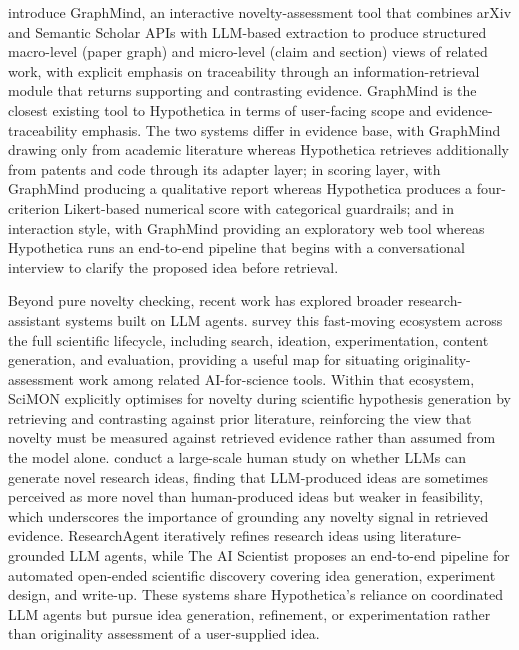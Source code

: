 \citet{dasilva2025graphmind} introduce GraphMind, an interactive novelty-assessment tool that combines arXiv and Semantic Scholar APIs with LLM-based extraction to produce structured macro-level (paper graph) and micro-level (claim and section) views of related work, with explicit emphasis on traceability through an information-retrieval module that returns supporting and contrasting evidence. GraphMind is the closest existing tool to Hypothetica in terms of user-facing scope and evidence-traceability emphasis. The two systems differ in evidence base, with GraphMind drawing only from academic literature whereas Hypothetica retrieves additionally from patents and code through its adapter layer; in scoring layer, with GraphMind producing a qualitative report whereas Hypothetica produces a four-criterion Likert-based numerical score with categorical guardrails; and in interaction style, with GraphMind providing an exploratory web tool whereas Hypothetica runs an end-to-end pipeline that begins with a conversational interview to clarify the proposed idea before retrieval.

Beyond pure novelty checking, recent work has explored broader research-assistant systems built on LLM agents. \citet{eger2025} survey this fast-moving ecosystem across the full scientific lifecycle, including search, ideation, experimentation, content generation, and evaluation, providing a useful map for situating originality-assessment work among related AI-for-science tools. Within that ecosystem, SciMON \citep{wang2024scimon} explicitly optimises for novelty during scientific hypothesis generation by retrieving and contrasting against prior literature, reinforcing the view that novelty must be measured against retrieved evidence rather than assumed from the model alone. \citet{si2024llmideas} conduct a large-scale human study on whether LLMs can generate novel research ideas, finding that LLM-produced ideas are sometimes perceived as more novel than human-produced ideas but weaker in feasibility, which underscores the importance of grounding any novelty signal in retrieved evidence. ResearchAgent \citep{baek2024researchagent} iteratively refines research ideas using literature-grounded LLM agents, while The AI Scientist \citep{lu2024aiscientist} proposes an end-to-end pipeline for automated open-ended scientific discovery covering idea generation, experiment design, and write-up. These systems share Hypothetica's reliance on coordinated LLM agents but pursue idea generation, refinement, or experimentation rather than originality assessment of a user-supplied idea.

